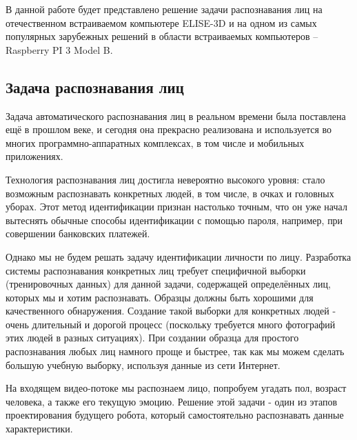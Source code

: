 \documentclass[14pt,a4paper]{scrartcl}
\begin{document}
		В данной работе будет представлено решение задачи распознавания лиц на отечественном встраиваемом компьютере ELISE-3D и на одном из самых популярных зарубежных решений в области встраиваемых компьютеров – Raspberry PI 3 Model B.

	
		
		\subsection{Задача распознавания лиц}
		
			Задача автоматического распознавания лиц в реальном времени была поставлена ещё в прошлом веке, и сегодня она прекрасно реализована и используется во многих программно-аппаратных комплексах, в том числе и мобильных приложениях.
			
			Технология распознавания лиц достигла невероятно высокого уровня: стало возможным распознавать конкретных людей, в том числе, в очках и головных уборах. Этот метод идентификации признан настолько точным, что он уже начал вытеснять обычные способы идентификации с помощью пароля, например, при совершении банковских платежей\cite{bib:Smart_Payment_China}. 
			
			Однако мы не будем решать задачу идентификации личности по лицу. Разработка системы распознавания конкретных лиц требует специфичной выборки (тренировочных данных) для данной задачи, содержащей определённых лиц, которых мы и хотим распознавать. Образцы должны быть хорошими для качественного обнаружения. Создание такой выборки для конкретных людей - очень длительный и дорогой процесс (поскольку требуется много фотографий этих людей в разных ситуациях). При создании образца для простого распознавания любых лиц намного проще и быстрее, так как мы можем сделать большую учебную выборку, используя данные из сети Интернет.
			
			На входящем видео-потоке мы распознаем лицо, попробуем угадать пол, возраст человека, а также его текущую эмоцию. Решение этой задачи - один из этапов проектирования будущего робота, который самостоятельно распознавать данные характеристики\cite{bib:Elise_CPU_Desc}.
		
\end{document}
